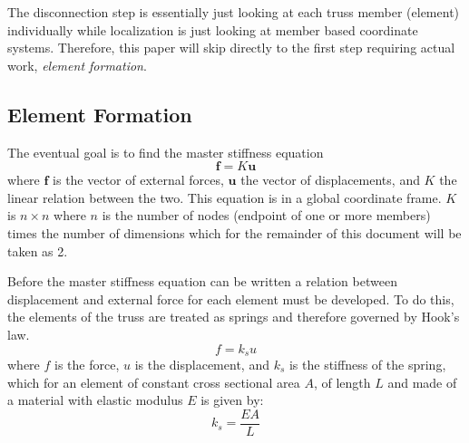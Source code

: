 \documentclass{article}
\begin{document}
The disconnection step is essentially just looking at each truss member
(element) individually while localization is just looking at member based
coordinate systems.  Therefore, this paper will skip directly to the first
step requiring actual work, \emph{element formation}.




\subsection{Element Formation}

The eventual goal is to find the master stiffness equation
\begin{equation}
    \mathbf{f}=K\mathbf{u} \label{eq:master_stiffness_equation}
\end{equation}
where $\mathbf{f}$ is the vector of external forces, $\mathbf{u}$ the vector
of displacements, and $K$ the linear relation between the two.  This equation
is in a global coordinate frame.  $K$ is $n\times{}n$ where $n$ is the number
of nodes (endpoint of one or more members) times the number of dimensions
which for the remainder of this document will be taken as 2.

Before the master stiffness equation can be written a relation between
displacement and external force for each element must be developed.  To do
this, the elements of the truss are treated as springs and therefore governed
by Hook's law.
\begin{equation}
    f=k_su \label{eq:hooks_law}
\end{equation}
where $f$ is the force, $u$ is the displacement, and $k_s$ is the stiffness of
the spring, which for an element of constant cross sectional area $A$, of
length $L$ and made of a material with elastic modulus $E$ is given by:
\begin{equation}
    k_s=\frac{EA}{L} \label{eq:stiffness_coefficient}
\end{equation}
\end{document}
